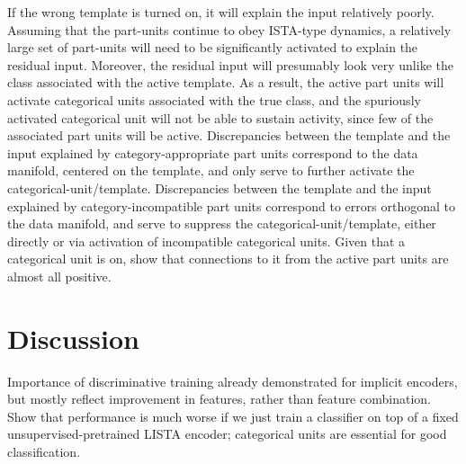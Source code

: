 \documentclass{article} %
\begin{document}
If the wrong template is turned on, it will explain the input relatively poorly.  Assuming that the part-units continue to obey ISTA-type dynamics, a relatively large set of part-units will need to be significantly activated to explain the residual input.  Moreover, the residual input will presumably look very unlike the class associated with the active template.  As a result, the active part units will activate categorical units associated with the true class, and the spuriously activated categorical unit will not be able to sustain activity, since few of the associated part units will be active.  Discrepancies between the template and the input explained by category-appropriate part units correspond to the data manifold, centered on the template, and only serve to further activate the categorical-unit/template.  Discrepancies between the template and the input explained by category-incompatible part units correspond to errors orthogonal to the data manifold, and serve to suppress the categorical-unit/template, either directly or via activation of incompatible categorical units.  Given that a categorical unit is on, show that connections to it from the active part units are almost all positive.



\section{Discussion}





Importance of discriminative training already demonstrated for implicit encoders, but mostly reflect improvement in features, rather than feature combination.  Show that performance is much worse if we just train a classifier on top of a fixed unsupervised-pretrained LISTA encoder; categorical units are essential for good classification.  
 
\end{document}
